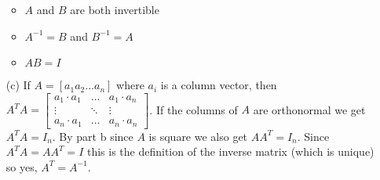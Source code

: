 \begin{SaveQuestion}
\begin{enumerate}
    \begin{itemize}
        \item $A$ and $B$ are both invertible
        \item $A^{-1} = B$ and $B^{-1}=A$
        \item $AB=I$
    \end{itemize}
    \item[(c)] If $A = [a_1 a_2 ... a_n]$ where $a_i$ is a column vector, then $A^TA = \begin{bmatrix}
        a_1 \cdot a_1 & \dots & a_1 \cdot a_n \\
        \vdots & \ddots & \vdots \\
        a_n \cdot a_1 & \dots & a_n \cdot a_n
    \end{bmatrix}$. If the columns of $A$ are orthonormal we get $A^TA = I_n$. By part b since $A$ is square we also get $AA^T = I_n$. Since $A^TA=AA^T=I$ this is the definition of the inverse matrix (which is unique) so yes, $A^T=A^{-1}$.
\end{enumerate}
\end{SaveQuestion}


